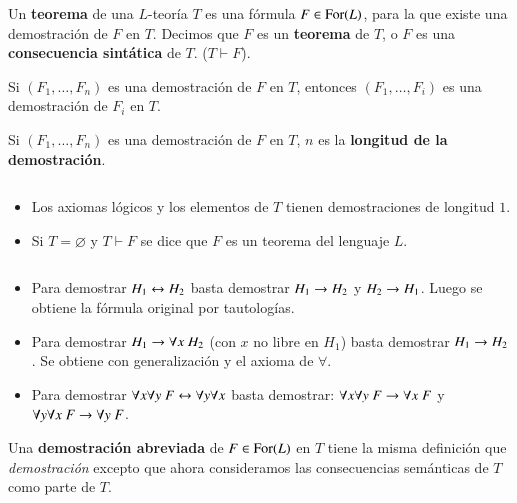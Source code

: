 \begin{dfn}
    Un \textbf{teorema} de una $L$-teoría $T$ es una fórmula $F \in \mathrm{For}(L)$, para la que existe una demostración de $F$ en $T$. Decimos que $F$ es un \textbf{teorema} de $T$, o $F$ es una \textbf{consecuencia sintática} de $T$. ($T \vdash F$).
\end{dfn}

\begin{obs}
    Si $(F_1, \ldots, F_n)$ es una demostración de $F$ en $T$, entonces $(F_1, \ldots, F_i)$ es una demostración de $F_i$ en $T$.
\end{obs}

\begin{dfn}
    Si $(F_1, \ldots, F_n)$ es una demostración de $F$ en $T$, $n$ es la \textbf{longitud de la demostración}.
\end{dfn}

\begin{obs}$ $
    \begin{itemize}
        \item Los axiomas lógicos y los elementos de $T$ tienen demostraciones de longitud $1$.
        \item Si $T = \varnothing$ y $T \vdash F$ se dice que $F$ es un teorema del lenguaje $L$.
    \end{itemize}
\end{obs}


\begin{obs}$ $
    \begin{itemize}
        \item Para demostrar $H_1 \leftrightarrow H_2$ basta demostrar $H_1 \rightarrow H_2$ y $H_2 \rightarrow H_1$. Luego se obtiene la fórmula original por tautologías.
        \item Para demostrar $H_1 \then \forall x\ H_2$ (con $x$ no libre en $H_1$) basta demostrar $H_1 \rightarrow H_2$. Se obtiene con generalización y el axioma de $\forall$.
        \item Para demostrar $\forall x \forall y\ F \leftrightarrow \forall y \forall x$ basta demostrar: $\forall x \forall y\ F \rightarrow \forall x\ F$ y $\forall y \forall x\ F \then \forall y\ F$.
    \end{itemize}
\end{obs}

\begin{dfn}
    Una \textbf{demostración abreviada} de $F \in \mathrm{For}(L)$ en $T$ tiene la misma definición que \textit{demostración} excepto que ahora consideramos las consecuencias semánticas de $T$ como parte de $T$.
\end{dfn}


